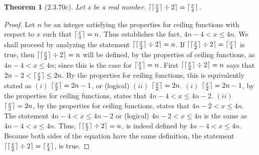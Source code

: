 \documentclass[a4paper, 12pt]{article}
\theoremstyle{plain}
\newtheorem*{theorem*}{Theorem}
\DeclarePairedDelimiter{\ceil}{\lceil}{\rceil}
\begin{document}
	
	\begin{theorem*}[2.3.70c]
		Let x be a real number. $\ceil{\ceil{\frac{x}{2}} \div 2} = \ceil{\frac{x}{4}}$.
	\end{theorem*}
	
	\begin{proof}
		Let $n$ be an integer satisfying the properties for ceiling functions with respect to $x$ such that
		$\ceil{\frac{x}{4}} = n$. Thus establishes the fact, $4n - 4 < x \le 4n$. We shall proceed by analyzing the statement $\ceil{\ceil{\frac{x}{2}} \div 2} = n$. If $\ceil{\ceil{\frac{x}{2}} \div 2} = \ceil{\frac{x}{4}}$ is true, then $\ceil{\ceil{\frac{x}{2}} \div 2} = n$ will be defined, by the properties of ceiling functions, as $4n - 4 < x \le 4n$; since this is the case for $\ceil{\frac{x}{4}} = n$.
		\newline
		\newline
		First $\ceil{\ceil{\frac{x}{2}} \div 2} = n$ says that $2n - 2 < \ceil{\frac{x}{2}} \le 2n$. By the properties for ceiling functions, this is equivalently stated as $(i)$ $\ceil{\frac{x}{2}} = 2n - 1$, or (logical) $(ii)$ $\ceil{\frac{x}{2}} = 2n$.
		\newline
		\newline
		\indent $(i)$ $\ceil{\frac{x}{2}} = 2n - 1$, by the properties for ceiling functions, states that \indent $4n - 4 < x \le 4n - 2$.
		\newline
		\newline
		\indent $(ii)$ $\ceil{\frac{x}{2}} = 2n$, by the properties for ceiling functions, states that \newline \indent $4n - 2 < x \le 4n$.
		\newline
		\newline
		The statement $4n - 4 < x \le 4n - 2$ or (logical) $4n - 2 < x \le 4n$ is the same as 
		$4n - 4 < x \le 4n$. Thus, $\ceil{\ceil{\frac{x}{2}} \div 2} = n$, is indeed defined by $4n - 4 < x \le 4n$. Because both sides of the equation have the same definition, the statement $\ceil{\ceil{\frac{x}{2}} \div 2} = \ceil{\frac{x}{4}}$, is true.
		
	\end{proof}
\end{document}
